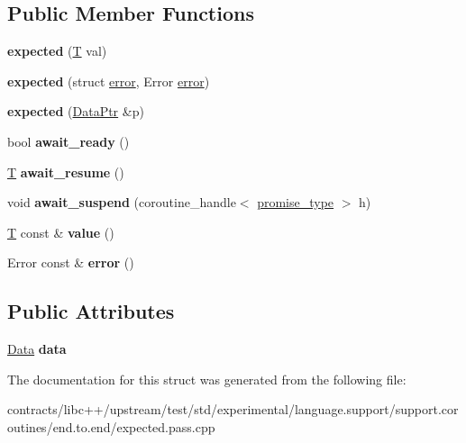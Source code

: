 \subsection*{Public Member Functions}
\begin{DoxyCompactItemize}
\item 
\mbox{\label{structexpected_a485635a99bc853f556e49fd6c99e73c1}} 
{\bfseries expected} (\mbox{\hyperlink{struct_t}{T}} val)
\item 
\mbox{\label{structexpected_abdea0a050dbcb3c958a6056b9bade3ad}} 
{\bfseries expected} (struct \mbox{\hyperlink{structerror}{error}}, Error \mbox{\hyperlink{structerror}{error}})
\item 
\mbox{\label{structexpected_ab62f4184afb07af1ed04864b2783f17d}} 
{\bfseries expected} (\mbox{\hyperlink{structexpected_1_1_data_ptr}{Data\+Ptr}} \&p)
\item 
\mbox{\label{structexpected_ad0d740c862eaab9fcc748945e7ed557f}} 
bool {\bfseries await\+\_\+ready} ()
\item 
\mbox{\label{structexpected_a90ea28a7752af07313a898261737bb39}} 
\mbox{\hyperlink{struct_t}{T}} {\bfseries await\+\_\+resume} ()
\item 
\mbox{\label{structexpected_a9228e89970f7ae2943e1fb08eacb0962}} 
void {\bfseries await\+\_\+suspend} (coroutine\+\_\+handle$<$ \mbox{\hyperlink{structexpected_1_1promise__type}{promise\+\_\+type}} $>$ h)
\item 
\mbox{\label{structexpected_ab78ff3610490e450f26a3a95a138b8ce}} 
\mbox{\hyperlink{struct_t}{T}} const  \& {\bfseries value} ()
\item 
\mbox{\label{structexpected_ab73196f4687fff7a71c588e815f60a16}} 
Error const  \& {\bfseries error} ()
\end{DoxyCompactItemize}
\subsection*{Public Attributes}
\begin{DoxyCompactItemize}
\item 
\mbox{\label{structexpected_a880d4975319306b8ba63b0af807840cf}} 
\mbox{\hyperlink{structexpected_1_1_data}{Data}} {\bfseries data}
\end{DoxyCompactItemize}


The documentation for this struct was generated from the following file\+:\begin{DoxyCompactItemize}
\item 
contracts/libc++/upstream/test/std/experimental/language.\+support/support.\+coroutines/end.\+to.\+end/expected.\+pass.\+cpp\end{DoxyCompactItemize}
